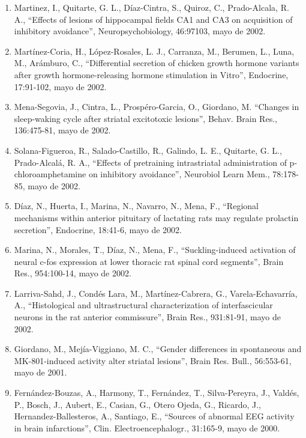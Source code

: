 \begin{enumerate}
\item Martinez, I., Quitarte, G. L., Díaz-Cintra, S., Quiroz, C., Prado-Alcala, R. A., “Effects of lesions of hippocampal fields CA1 and CA3 on acquisition of 
inhibitory avoidance”, Neuropsychobiology, 46:97103,  mayo de 2002.

\item Martínez-Coria, H., López-Rosales, L. J., Carranza, M., Berumen, L., Luna, M., Arámburo, C., “Differential secretion of chicken growth hormone variants 
after growth hormone-releasing hormone stimulation in Vitro”, Endocrine, 17:91-102,  mayo de 2002.

\item Mena-Segovia, J., Cintra, L., Prospéro-Garcia, O., Giordano, M. “Changes in sleep-waking cycle after striatal excitotoxic lesions”, Behav. Brain Res., 
136:475-81,  mayo de 2002.

\item Solana-Figueroa, R., Salado-Castillo, R., Galindo, L. E., Quitarte, G. L., Prado-Alcalá, R. A., “Effects of pretraining intrastriatal administration of 
p-chloroamphetamine on inhibitory avoidance”, Neurobiol Learn Mem., 78:178-85,  mayo de 2002.

\item Díaz, N., Huerta, I., Marina, N., Navarro, N., Mena, F., “Regional mechanisms within anterior pituitary of lactating rats may regulate prolactin 
secretion”, 
Endocrine, 18:41-6,  mayo de 2002.

\item Marina, N., Morales, T., Díaz, N., Mena, F., “Suckling-induced activation of neural c-fos expression at lower thoracic rat spinal cord segments”, Brain 
Res., 954:100-14,  mayo de 2002.

\item Larriva-Sahd, J., Condés Lara, M., Martínez-Cabrera, G., Varela-Echavarría, A., “Histological and ultrastructural characterization of interfascicular 
neurons in the rat anterior commissure”, Brain Res., 931:81-91,  mayo de 2002. 

\item Giordano, M., Mejía-Viggiano, M. C., “Gender differences in spontaneous and MK-801-induced activity alter striatal lesions”, Brain Res. Bull., 56:553-61,  
mayo de 2001.

\item Fernández-Bouzas, A., Harmony, T., Fernández, T., Silva-Pereyra, J., Valdés, P., Bosch, J., Aubert, E., Casian, G., Otero Ojeda, G., Ricardo, J., 
Hernandez-Ballesteros, A., Santiago, E., “Sources of abnormal EEG activity in brain infarctions”, Clin. Electroencephalogr., 31:165-9,  mayo de 2000.


\end{enumerate}
